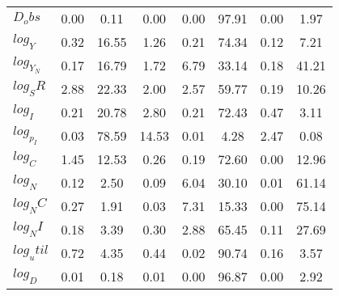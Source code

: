 \begin{center}
\begin{longtable}{lccccccc}
$D_obs     $	 & 	        0.00	 & 	        0.11	 & 	        0.00	 & 	        0.00	 & 	       97.91	 & 	        0.00	 & 	        1.97 \\ 
$log_Y     $	 & 	        0.32	 & 	       16.55	 & 	        1.26	 & 	        0.21	 & 	       74.34	 & 	        0.12	 & 	        7.21 \\ 
$log_Y_N   $	 & 	        0.17	 & 	       16.79	 & 	        1.72	 & 	        6.79	 & 	       33.14	 & 	        0.18	 & 	       41.21 \\ 
$log_SR    $	 & 	        2.88	 & 	       22.33	 & 	        2.00	 & 	        2.57	 & 	       59.77	 & 	        0.19	 & 	       10.26 \\ 
$log_I     $	 & 	        0.21	 & 	       20.78	 & 	        2.80	 & 	        0.21	 & 	       72.43	 & 	        0.47	 & 	        3.11 \\ 
$log_p_I   $	 & 	        0.03	 & 	       78.59	 & 	       14.53	 & 	        0.01	 & 	        4.28	 & 	        2.47	 & 	        0.08 \\ 
$log_C     $	 & 	        1.45	 & 	       12.53	 & 	        0.26	 & 	        0.19	 & 	       72.60	 & 	        0.00	 & 	       12.96 \\ 
$log_N     $	 & 	        0.12	 & 	        2.50	 & 	        0.09	 & 	        6.04	 & 	       30.10	 & 	        0.01	 & 	       61.14 \\ 
$log_NC    $	 & 	        0.27	 & 	        1.91	 & 	        0.03	 & 	        7.31	 & 	       15.33	 & 	        0.00	 & 	       75.14 \\ 
$log_NI    $	 & 	        0.18	 & 	        3.39	 & 	        0.30	 & 	        2.88	 & 	       65.45	 & 	        0.11	 & 	       27.69 \\ 
$log_util  $	 & 	        0.72	 & 	        4.35	 & 	        0.44	 & 	        0.02	 & 	       90.74	 & 	        0.16	 & 	        3.57 \\ 
$log_D     $	 & 	        0.01	 & 	        0.18	 & 	        0.01	 & 	        0.00	 & 	       96.87	 & 	        0.00	 & 	        2.92 \\ 
\end{longtable}
 \end{center}
